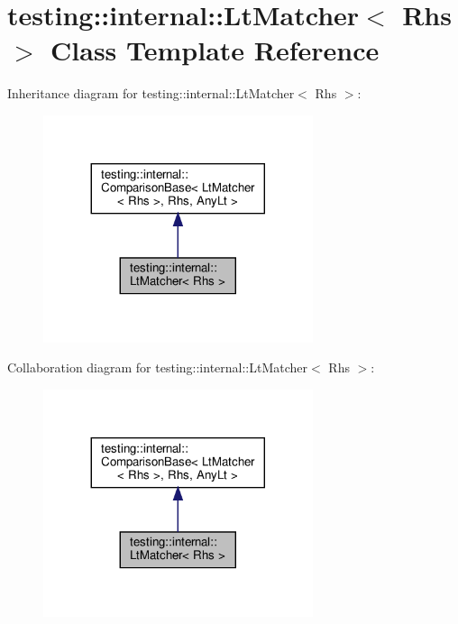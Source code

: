 \hypertarget{classtesting_1_1internal_1_1_lt_matcher}{}\section{testing\+:\+:internal\+:\+:Lt\+Matcher$<$ Rhs $>$ Class Template Reference}
\label{classtesting_1_1internal_1_1_lt_matcher}


Inheritance diagram for testing\+:\+:internal\+:\+:Lt\+Matcher$<$ Rhs $>$\+:
\nopagebreak
\begin{figure}[H]
\begin{center}
\leavevmode
\includegraphics[width=224pt]{classtesting_1_1internal_1_1_lt_matcher__inherit__graph}
\end{center}
\end{figure}


Collaboration diagram for testing\+:\+:internal\+:\+:Lt\+Matcher$<$ Rhs $>$\+:
\nopagebreak
\begin{figure}[H]
\begin{center}
\leavevmode
\includegraphics[width=224pt]{classtesting_1_1internal_1_1_lt_matcher__coll__graph}
\end{center}
\end{figure}
